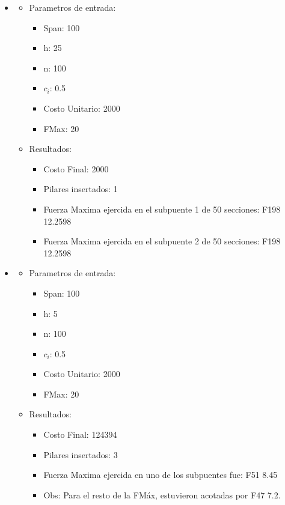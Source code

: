 \begin{itemize}
\begin{itemize}
      \end{itemize}
\item
  \begin{itemize}
    \item Parametros de entrada:
	  \begin{itemize}
	    \item Span: 100
	    \item h: 25
	    \item n: 100
	    \item $c_i$: 0.5
	    \item Costo Unitario: 2000
	    \item FMax: 20
	  \end{itemize}
      \item Resultados:
	  \begin{itemize}
	    \item Costo Final: 2000
	    \item Pilares insertados: 1
	    \item Fuerza Maxima ejercida en el subpuente 1 de 50 secciones: F198 12.2598
	    \item Fuerza Maxima ejercida en el subpuente 2 de 50 secciones: F198 12.2598
	  \end{itemize}
      \end{itemize}
\item
  \begin{itemize}
    \item Parametros de entrada:
	  \begin{itemize}
	    \item Span: 100
	    \item h: 5
	    \item n: 100
	    \item $c_i$: 0.5
	    \item Costo Unitario: 2000
	    \item FMax: 20
	  \end{itemize}
      \item Resultados:
	  \begin{itemize}
	    \item Costo Final: 124394
	    \item Pilares insertados: 3
	    \item Fuerza Maxima ejercida en uno de los subpuentes fue: F51 8.45
	    \item Obs: Para el resto de la FM\'ax, estuvieron acotadas por F47 7.2.
	  \end{itemize}
      \end{itemize}

\end{itemize}
